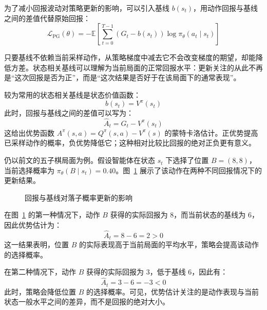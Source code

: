 \documentclass[UTF8,a4paper,zihao=-4,oneside,openany]{ctexbook}
\begin{document}
为了减小回报波动对策略更新的影响，可以引入基线 $b(s_t)$，用动作回报与基线之间的差值代替原始回报：
\begin{equation}
\mathcal{L}_{\mathrm{PG}}(\theta)
=
-
\mathbb{E}
\left[
\sum_{t=0}^{T-1}
\left(
G_t-b(s_t)
\right)
\log\pi_{\theta}(a_t\mid s_t)
\right]
\end{equation}

只要基线不依赖当前采样动作，从策略梯度中减去它不会改变梯度的期望，却能降低方差。状态相关基线可以理解为当前局面的正常回报水平：更新关注的从此不再是“这次回报是否为正”，而是“这次结果是否好于在该局面下的通常表现”。

较为常用的状态相关基线是状态价值函数：
\begin{equation}
b(s_t)=V^{\pi}(s_t)
\end{equation}
此时，回报与基线之间的差值可以写为：
\begin{equation}
\widehat{A}_t
=
G_t-V^{\pi}(s_t)
\end{equation}
这给出优势函数 $A^\pi(s,a)=Q^\pi(s,a)-V^\pi(s)$ 的蒙特卡洛估计。正优势提高已采样动作的概率，负优势降低它；这种相对比较比回报的绝对正负更有意义。

仍以前文的五子棋局面为例。假设智能体在状态 $s_t$ 下选择了位置 $B=(8,8)$，当前选择概率为 $\pi_{\theta}(B\mid s_t)=0.40$。图~\ref{fig:policy_advantage_update} 展示了该动作在两种不同回报情况下的更新结果。

\begin{figure}[htbp]
  \centering
  \caption{回报与基线对落子概率更新的影响}
  \label{fig:policy_advantage_update}
\end{figure}

在图~\ref{fig:policy_advantage_update} 的第一种情况下，动作 $B$ 获得的实际回报为 $8$，而当前状态的基线为 $6$，因此优势估计为：
\begin{equation}
\widehat{A}_t
=
8-6
=
2>0
\end{equation}
这一结果表明，位置 $B$ 的实际表现高于当前局面的平均水平，策略会提高该动作的选择概率。

在第二种情况下，动作 $B$ 获得的实际回报为 $3$，低于基线 $6$，因此有：
\begin{equation}
\widehat{A}_t
=
3-6
=
-3<0
\end{equation}
此时，策略会降低位置 $B$ 的选择概率。可见，优势估计关注的是动作表现与当前状态一般水平之间的差异，而不是回报的绝对大小。
\end{document}
